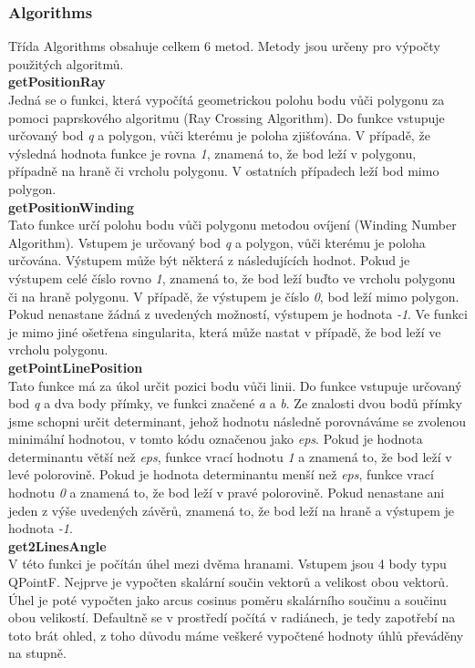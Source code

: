 \documentclass[a4paper, 12pt]{article}
\begin{document}
\subsubsection{Algorithms}
Třída Algorithms obsahuje celkem 6 metod. Metody jsou určeny pro výpočty použitých algoritmů.
\\

\textbf{getPositionRay}\\
Jedná se o funkci, která vypočítá geometrickou polohu bodu vůči polygonu za pomoci paprskového algoritmu (Ray Crossing Algorithm). Do funkce vstupuje určovaný bod \textit{q} a polygon, vůči kterému je poloha zjišťována. V případě, že výsledná hodnota funkce je rovna \textit{1}, znamená to, že bod leží v polygonu, případně na hraně či vrcholu polygonu. V ostatních případech leží bod mimo polygon.\\

\textbf{getPositionWinding}\\
Tato funkce určí polohu bodu vůči polygonu metodou ovíjení (Winding Number Algorithm). Vstupem je určovaný bod \textit{q} a polygon, vůči kterému je poloha určována. Výstupem může být některá z následujících hodnot. Pokud je výstupem celé číslo rovno \textit{1}, znamená to, že bod leží buďto ve vrcholu polygonu či na hraně polygonu. V případě, že výstupem je číslo \textit{0}, bod leží mimo polygon. Pokud nenastane žádná z uvedených možností, výstupem je hodnota \textit{-1}. Ve funkci je mimo jiné ošetřena singularita, která může nastat v případě, že bod leží ve vrcholu polygonu.\\

\textbf{getPointLinePosition}\\
Tato funkce má za úkol určit pozici bodu vůči linii. Do funkce vstupuje určovaný bod \textit{q} a dva body přímky, ve funkci značené \textit{a} a \textit{b}. Ze znalosti dvou bodů přímky jsme schopni určit determinant, jehož hodnotu následně porovnáváme se zvolenou minimální hodnotou, v tomto kódu označenou jako \textit{eps}. Pokud je hodnota determinantu větší než \textit{eps}, funkce vrací hodnotu \textit{1} a znamená to, že bod leží v levé polorovině. Pokud je hodnota determinantu menší než \textit{eps}, funkce vrací hodnotu \textit{0} a znamená to, že bod leží v pravé polorovině. Pokud nenastane ani jeden z výše uvedených závěrů, znamená to, že bod leží na hraně a výstupem je hodnota \textit{-1}.\\

\textbf{get2LinesAngle}\\
V této funkci je počítán úhel mezi dvěma hranami. Vstupem jsou 4 body typu QPointF. Nejprve je vypočten skalární součin vektorů a velikost obou vektorů. Úhel je poté vypočten jako arcus cosinus poměru skalárního součinu a součinu obou velikostí. Defaultně se v prostředí počítá v radiánech, je tedy zapotřebí na toto brát ohled, z toho důvodu máme veškeré vypočtené hodnoty úhlů převáděny na stupně. \\
\end{document}
